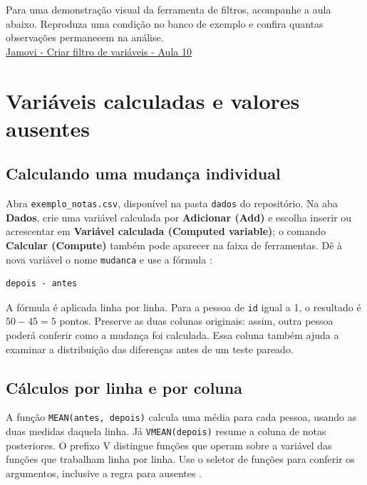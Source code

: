 \begin{tcolorbox}[colback=white,colframe=red,title={\faPlayCircle \ Dica de Conteúdo}]
  Para uma demonstração visual da ferramenta de filtros, acompanhe a aula abaixo. Reproduza uma condição no banco de exemplo e confira quantas observações permanecem na análise.\\
  \textcolor{red}{\faYoutube} \href{https://www.youtube.com/watch?v=D_HNd7RnRO0}{Jamovi - Criar filtro de variáveis - Aula 10}
\end{tcolorbox}

\section{Variáveis calculadas e valores ausentes}

\subsection{Calculando uma mudança individual}

Abra \texttt{exemplo\_notas.csv}, disponível na pasta \texttt{dados} do repositório. Na aba \textbf{Dados}, crie uma variável calculada por \textbf{Adicionar (Add)} e escolha inserir ou acrescentar em \textbf{Variável calculada (Computed variable)}; o comando \textbf{Calcular (Compute)} também pode aparecer na faixa de ferramentas. Dê à nova variável o nome \texttt{mudanca} e use a fórmula \parencite{JamoviCalculadas}:
\begin{verbatim}
depois - antes
\end{verbatim}

A fórmula é aplicada linha por linha. Para a pessoa de \texttt{id} igual a 1, o resultado é $50-45=5$ pontos. Preserve as duas colunas originais: assim, outra pessoa poderá conferir como a mudança foi calculada. Essa coluna também ajuda a examinar a distribuição das diferenças antes de um teste pareado.

\subsection{Cálculos por linha e por coluna}

A função \texttt{MEAN(antes, depois)} calcula uma média para cada pessoa, usando as duas medidas daquela linha. Já \texttt{VMEAN(depois)} resume a coluna de notas posteriores. O prefixo V distingue funções que operam sobre a variável das funções que trabalham linha por linha. Use o seletor de funções para conferir os argumentos, inclusive a regra para ausentes \parencite{JamoviFuncoes}.

